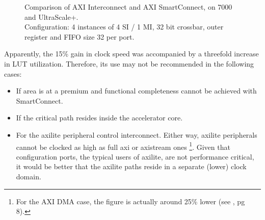 \begin{figure}[ht!]
\centering
{}
\caption{Comparison of AXI Interconnect and AXI SmartConnect, on 7000 and UltraScale+.\\
	Configuration: 4 instances of 4 SI / 1 MI, 32 bit crossbar, outer register and FIFO size 32 per port.}
\label{tab:smartconnect}
\end{figure}

Apparently, the 15\% gain in clock speed was accompanied by a threefold increase in LUT utilization.
Therefore, its use may not be recommended in the following cases:

\begin{itemize}
\item	If area is at a premium and functional completeness cannot be achieved with SmartConnect.
\item	If the critical path resides inside the accelerator core.
\item	For the \gls{axilite} peripheral control interconnect. Either way, \gls{axilite} peripherals
	cannot be clocked as high as full \gls{axi} or \gls{axistream} ones
	\footnote{For the AXI DMA case, the figure is actually around 25\%
	lower (see \cite{pg021}, pg 8).}. Given that configuration
	ports, the typical users of \gls{axilite}, are not performance critical, it would be
	better that the \gls{axilite} paths reside in a separate (lower) clock domain.
\end{itemize}

